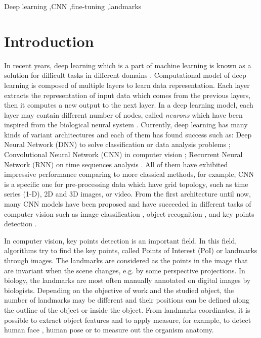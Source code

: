 \documentclass[review]{elsarticle}
\begin{document}
\begin{frontmatter}
\begin{abstract}
\end{abstract}

\begin{keyword}
Deep learning \sep CNN \sep fine-tuning \sep landmarks
\end{keyword}

\end{frontmatter}

\linenumbers

\section{Introduction}
\label{sIntroduction}
In recent years, deep learning which is a part of machine learning is known as a
solution for difficult tasks in different domains \cite{lecun2015deep}. Computational model of deep
learning is composed of multiple layers to learn data
representation. Each layer extracts the representation of input data
which comes from the previous layers, then it computes a new
output to the next layer. In a deep learning model, each layer may
contain different number of nodes, called \textit{neurons} which have
been inspired from the biological neural system
\cite{arbib2012brains}. Currently, deep learning has many kinds of
variant architectures and each of them has found success such as: Deep
Neural Network (DNN) to solve classification or data analysis
problems \cite{hinton2012deep, mikolov2011strategies}; Convolutional
Neural Network (CNN) in computer vision \cite{lecun1998gradient,
  krizhevsky2012imagenet,szegedy2015going}; Recurrent Neural Network
(RNN) on time sequences analysis \cite{lecun2015deep,jean2014using,
  sutskever2014sequence,collobert2011natural}. All of
them have exhibited impressive performance comparing to more classical
methods, for example, CNN is a specific
one for pre-processing data which have grid topology, such as time series (1-D), 2D and 3D images, or video. From the
first architecture \cite{lecun1998gradient} until now, many CNN models
have been proposed and have succeeded in different tasks of computer
vision such as image classification \cite{lecun1998gradient,
  krizhevsky2012imagenet,szegedy2015going}, object recognition
\cite{szegedy2015going,farabet2013learning,li2015convolutional}, and
key points detection \cite{liu2016fashion, sun2013deep,
  zhang2014facial, cintas2016automatic}.

In computer vision, key points detection is an important field. In
this field, algorithms try to find the key points, called Points of
Interest (PoI)  or landmarks through images. The landmarks are
considered as the points in the image that are invariant when the
scene changes, e.g. by some perspective projections. In biology, the
landmarks are most often manually annotated on digital images by
biologists. Depending on the objective of work and the studied object,
the number of landmarks may be different and their positions
 can be defined along the outline of the object or inside the
object. From landmarks coordinates, it is possible to extract object
features and to apply measure, for example, to detect human face
\cite{sun2013deep}, human pose \cite{huang2017coarse} or to measure out the organism anatomy.
\end{document}
